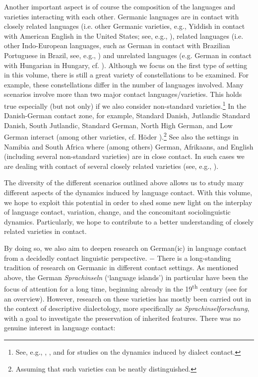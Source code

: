 \documentclass[output=paper]{langsci/langscibook}
\begin{document}
Another important aspect is of course the composition of the languages and varieties interacting with each other. Germanic languages are in contact with closely related languages (i.e. other Germanic varieties, e.g., Yiddish in contact with American English in the United States; see, e.g., ), related languages (i.e. other Indo-European languages, such as German in contact with Brazilian Portuguese in Brazil, see, e.g., \citealt{rosenberg_comparative_2003}) and unrelated languages (e.g. German in contact with Hungarian in Hungary, cf. \citealt{knipf-komlosi_ungarn_2008}). Although we focus on the first type of setting in this volume, there is still a great variety of constellations to be examined. For example, these constellations differ in the number of languages involved. Many scenarios involve more than two major contact languages/varieties. This holds true especially (but not only) if we also consider non-standard varieties.\footnote{See, e.g., \citet{schirmunski_sprachgeschichte_1930}, \citet{trudgill_dialects_1986}, and \citet{rosenberg_dialect_2005} for studies on the dynamics induced by dialect contact.} In the Danish-German contact zone, for example, Standard Danish, Jutlandic Standard Danish, South Jutlandic, Standard German, North High German, and Low German interact (among other varieties, cf. Höder ).\footnote{Assuming that such varieties can be neatly distinguished.} See also the settings in Namibia and South Africa where (among others) German, Afrikaans, and English (including several non-standard varieties) are in close contact. In such cases we are dealing with contact of several closely related varieties (see, e.g., \citealt{zimmer_deutsch_2019}).

The diversity of the different scenarios outlined above allows us to study many different aspects of the dynamics induced by language contact. With this volume, we hope to exploit this potential in order to shed some new light on the interplay of language contact, variation, change, and the concomitant sociolinguistic dynamics. Particularly, we hope to contribute to a better understanding of closely related varieties in contact. 

By doing so, we also aim to deepen research on German(ic) in language contact from a decidedly contact linguistic perspective. $-$ There is a long-standing tradition of research on Germanic in different contact settings. As mentioned above, the German \textit{Sprachinseln} (‘language islands’) in particular have been the focus of attention for a long time, beginning already in the 19\textsuperscript{th} century (see \citealt{rosenberg_dialect_2005} for an overview). However, research on these varieties has mostly been carried out in the context of descriptive dialectology, more specifically as \textit{Sprachinselforschung}, with a goal to investigate the preservation of inherited features. There was no genuine interest in language contact:
\end{document}
